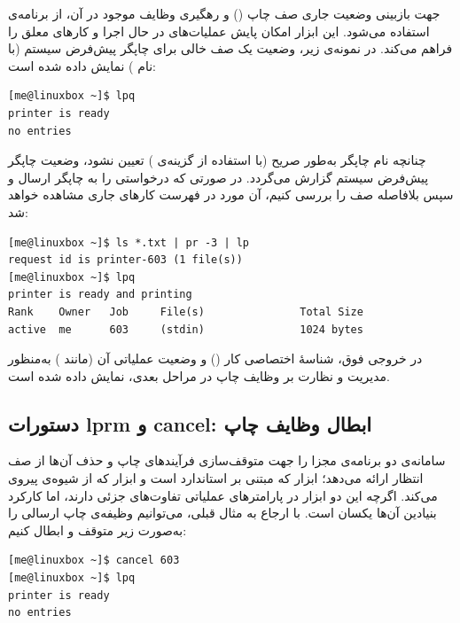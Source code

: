 جهت بازبینی وضعیت جاری صف چاپ () و رهگیری وظایف موجود در آن، از برنامه‌ی  استفاده می‌شود. این ابزار امکان پایش عملیات‌های در حال اجرا و کارهای معلق را فراهم می‌کند. در نمونه‌ی زیر، وضعیت یک صف خالی برای چاپگر پیش‌فرض سیستم (با نام ) نمایش داده شده است:

\begin{latin}
\begin{lstlisting}
[me@linuxbox ~]$ lpq
printer is ready
no entries
\end{lstlisting}
\end{latin}

چنانچه نام چاپگر به‌طور صریح (با استفاده از گزینه‌ی ) تعیین نشود، وضعیت چاپگر پیش‌فرض سیستم گزارش می‌گردد. در صورتی که درخواستی را به چاپگر ارسال و سپس بلافاصله صف را بررسی کنیم، آن مورد در فهرست کارهای جاری مشاهده خواهد شد:

\begin{latin}
\begin{lstlisting}
[me@linuxbox ~]$ ls *.txt | pr -3 | lp
request id is printer-603 (1 file(s))
[me@linuxbox ~]$ lpq
printer is ready and printing
Rank    Owner   Job     File(s)               Total Size
active  me      603     (stdin)               1024 bytes
\end{lstlisting}
\end{latin}

در خروجی فوق، شناسهٔ اختصاصی کار () و وضعیت عملیاتی آن (مانند ) به‌منظور مدیریت و نظارت بر وظایف چاپ در مراحل بعدی، نمایش داده شده است.

\subsection{دستورات lprm و cancel: ابطال وظایف چاپ}

سامانه‌ی  دو برنامه‌ی مجزا را جهت متوقف‌سازی فرآیندهای چاپ و حذف آن‌ها از صف انتظار ارائه می‌دهد؛ ابزار  که مبتنی بر استاندارد  است و ابزار  که از شیوه‌ی  پیروی می‌کند. اگرچه این دو ابزار در پارامترهای عملیاتی تفاوت‌های جزئی دارند، اما کارکرد بنیادین آن‌ها یکسان است. با ارجاع به مثال قبلی، می‌توانیم وظیفه‌ی چاپ ارسالی را به‌صورت زیر متوقف و ابطال کنیم:

\begin{latin}
\begin{lstlisting}
[me@linuxbox ~]$ cancel 603
[me@linuxbox ~]$ lpq
printer is ready
no entries
\end{lstlisting}
\end{latin}

